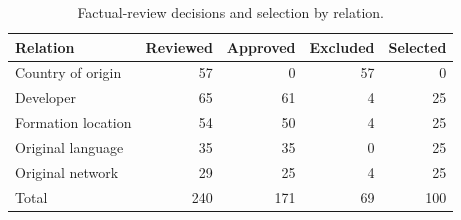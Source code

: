 \begin{table}[t]
\centering
\caption{Factual-review decisions and selection by relation.}
\label{tab:retention_stages}
\begin{tabular}{lrrrr}
\toprule
Relation & Reviewed & Approved & Excluded & Selected\\
\midrule
Country of origin & 57 & 0 & 57 & 0\\
Developer & 65 & 61 & 4 & 25\\
Formation location & 54 & 50 & 4 & 25\\
Original language & 35 & 35 & 0 & 25\\
Original network & 29 & 25 & 4 & 25\\
\midrule
Total & 240 & 171 & 69 & 100\\
\bottomrule
\end{tabular}
\end{table}

